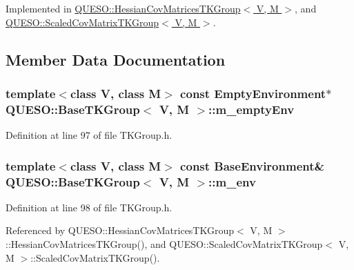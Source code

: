 Implemented in \hyperlink{class_q_u_e_s_o_1_1_hessian_cov_matrices_t_k_group_abf0f6a04543c18b2f95e615b09191c2b}{Q\-U\-E\-S\-O\-::\-Hessian\-Cov\-Matrices\-T\-K\-Group$<$ V, M $>$}, and \hyperlink{class_q_u_e_s_o_1_1_scaled_cov_matrix_t_k_group_a3189c3503bf9eb4229ec707594d75516}{Q\-U\-E\-S\-O\-::\-Scaled\-Cov\-Matrix\-T\-K\-Group$<$ V, M $>$}.



\subsection{Member Data Documentation}
\hypertarget{class_q_u_e_s_o_1_1_base_t_k_group_a41a8a2d2fde3c1994d3a542ccf9a194e}{
\subsubsection[{m\-\_\-empty\-Env}]{\setlength{\rightskip}{0pt plus 5cm}template$<$class V, class M$>$ const {\bf Empty\-Environment}$\ast$ {\bf Q\-U\-E\-S\-O\-::\-Base\-T\-K\-Group}$<$ V, M $>$\-::m\-\_\-empty\-Env\hspace{0.3cm}{\ttfamily [protected]}}}\label{class_q_u_e_s_o_1_1_base_t_k_group_a41a8a2d2fde3c1994d3a542ccf9a194e}


Definition at line 97 of file T\-K\-Group.\-h.

\hypertarget{class_q_u_e_s_o_1_1_base_t_k_group_a2bce5e8aa5c844d4332a0e73cf00a1f9}{
\subsubsection[{m\-\_\-env}]{\setlength{\rightskip}{0pt plus 5cm}template$<$class V, class M$>$ const {\bf Base\-Environment}\& {\bf Q\-U\-E\-S\-O\-::\-Base\-T\-K\-Group}$<$ V, M $>$\-::m\-\_\-env\hspace{0.3cm}{\ttfamily [protected]}}}\label{class_q_u_e_s_o_1_1_base_t_k_group_a2bce5e8aa5c844d4332a0e73cf00a1f9}


Definition at line 98 of file T\-K\-Group.\-h.



Referenced by Q\-U\-E\-S\-O\-::\-Hessian\-Cov\-Matrices\-T\-K\-Group$<$ V, M $>$\-::\-Hessian\-Cov\-Matrices\-T\-K\-Group(), and Q\-U\-E\-S\-O\-::\-Scaled\-Cov\-Matrix\-T\-K\-Group$<$ V, M $>$\-::\-Scaled\-Cov\-Matrix\-T\-K\-Group().

